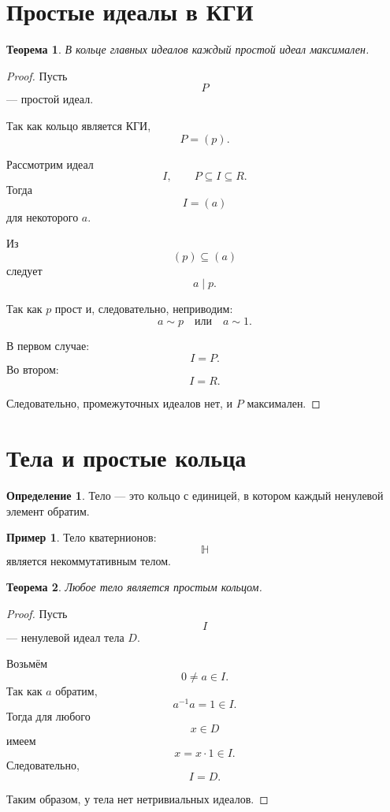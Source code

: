 \documentclass[12pt, a4paper]{article}
\newtheorem{theorem}{Теорема}
\theoremstyle{definition}
\newtheorem{definition}{Определение}
\newtheorem{example}{Пример}
\theoremstyle{remark}
\begin{document}
\section{Простые идеалы в КГИ}

\begin{theorem}
	В кольце главных идеалов каждый простой идеал максимален.
\end{theorem}

\begin{proof}
	Пусть
	\[
	P
	\]
	--- простой идеал.
	
	Так как кольцо является КГИ,
	\[
	P=(p).
	\]
	
	Рассмотрим идеал
	\[
	I,
	\qquad
	P\subseteq I\subseteq R.
	\]
	Тогда
	\[
	I=(a)
	\]
	для некоторого $a$.
	
	Из
	\[
	(p)\subseteq(a)
	\]
	следует
	\[
	a\mid p.
	\]
	
	Так как $p$ прост и, следовательно, неприводим:
	\[
	a\sim p
	\quad \text{или}\quad
	a\sim 1.
	\]
	
	В первом случае:
	\[
	I=P.
	\]
	Во втором:
	\[
	I=R.
	\]
	
	Следовательно, промежуточных идеалов нет, и $P$ максимален.
\end{proof}

\section{Тела и простые кольца}

\begin{definition}
	Тело --- это кольцо с единицей, в котором каждый ненулевой элемент обратим.
\end{definition}

\begin{example}
	Тело кватернионов:
	\[
	\mathbb{H}
	\]
	является некоммутативным телом.
\end{example}

\begin{theorem}
	Любое тело является простым кольцом.
\end{theorem}

\begin{proof}
	Пусть
	\[
	I
	\]
	--- ненулевой идеал тела $D$.
	
	Возьмём
	\[
	0\neq a\in I.
	\]
	Так как $a$ обратим,
	\[
	a^{-1}a=1\in I.
	\]
	Тогда для любого
	\[
	x\in D
	\]
	имеем
	\[
	x=x\cdot1\in I.
	\]
	Следовательно,
	\[
	I=D.
	\]
	
	Таким образом, у тела нет нетривиальных идеалов.
\end{proof}
\end{document}
